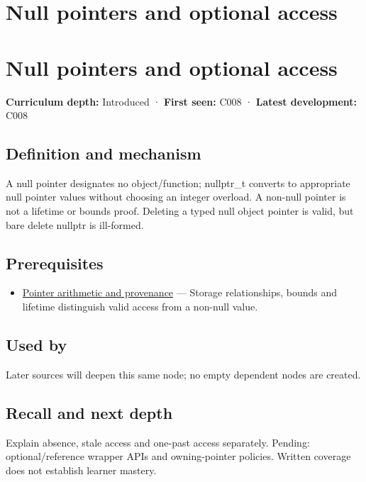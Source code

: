 \hypertarget{appendix-afae48c31800}{}
\section*{Null pointers and optional access}
\section{Null pointers and optional access}\label{null-pointers-and-optional-access}

\textbf{Curriculum depth:} Introduced · \textbf{First seen:} C008 · \textbf{Latest development:} C008

\subsection{Definition and mechanism}\label{definition-and-mechanism}

A null pointer designates no object/function; nullptr\_t converts to appropriate null pointer values without choosing an integer overload. A non-null pointer is not a lifetime or bounds proof. Deleting a typed null object pointer is valid, but bare delete nullptr is ill-formed.

\subsection{Prerequisites}\label{prerequisites}

\begin{itemize}
\tightlist
\item
  \hyperref[appendix-6af5921bc853]{Pointer arithmetic and provenance} --- Storage relationships, bounds and lifetime distinguish valid access from a non-null value.
\end{itemize}

\subsection{Used by}\label{used-by}

Later sources will deepen this same node; no empty dependent nodes are created.

\subsection{Recall and next depth}\label{recall-and-next-depth}

Explain absence, stale access and one-past access separately. Pending: optional/reference wrapper APIs and owning-pointer policies. Written coverage does not establish learner mastery.

